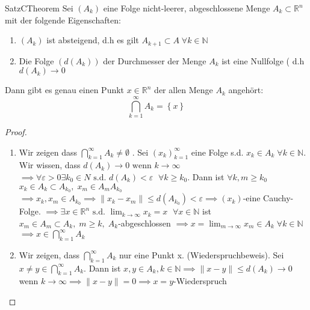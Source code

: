 \begin{ibox}[24]{Satz}{CTheorem}
    Sei $ \left( A_{k} \right) $ eine Folge nicht-leerer, abgeschlossene Menge $ A_{k} \subset
	\mathbb{R}^n  $ mit der folgende Eigenschaften:
	\begin{enumerate}[label=\alph*)]
		\item $ \left( A_{k} \right) $ ist absteigend, d.h es gilt $ A_{k+1} \subset A \; \forall 
			k \in  \mathbb{N} $ 
		\item Die Folge $ \left( d \left( A_{k} \right)  \right)  $ der Durchmesser der Menge $ A_k $ 
			ist eine Nullfolge ( d.h $ d \left( A_k \right) \to 0 $ 
	\end{enumerate}
	Dann gibt es genau einen Punkt $ x \in \mathbb{R}^n  $ der allen Menge $ A_{k} $ angehört:
	$$ \bigcap\limits_{k=1}^{\infty} A_k = \left\{ x \right\}   $$
\end{ibox}
\begin{proof}
	\begin{enumerate}[label=\alph*)]
		\item Wir zeigen dass $ \bigcap\limits_{k=1}^{\infty} A_k \neq \emptyset  $ . Sei 
			$ \left( x_{k} \right)_{k =1}^{\infty} $ eine Folge s.d. $ x_{k} \in A_k \; \forall 
			k \in  \mathbb{N} $. Wir wissen, dass $ d \left( A_k \right) \to 0 \text{ wenn } k \to
			\infty $ $ \implies \forall \varepsilon >0 \exists k_0 \in N \text{ s.d. } 
			d \left( A_k \right) < \varepsilon \; $ $ \forall k \geq k_0 $. Dann ist $ \forall 
			k,m \geq k_0 \; \; \; \;$  $  x_{k} \in A_k \subset A_{k_{0}}, \; x_{m} \in A_{m} A_{k_0}$
			$ \implies x_{k}, x_{m} \in A_{k_0} \implies  \|x_{k} - x_{m} \| \leq d 
			\left( A_{k_0} \right) < \varepsilon  \implies \left( x_{k} \right)  $-eine Cauchy-Folge.
			$ \implies \exists x \in \mathbb{R}^n  \text{ s.d. } \lim_{k \to \infty} x_{k} = x $ 
			$ \; \forall x \in \mathbb{N}  $ ist $ x_{m} \in A_{m} \subset A_{k}, \;  m \geq k,
			\; A_{k}$-abgeschlossen $ \implies x = \lim_{m \to \infty}x_{m} \in A_{k} \; \forall k
			\in \mathbb{N} $ $ \implies  x \in  \bigcap\limits_{k=1}^{\infty} A_{k}  $ 
		\item Wir zeigen, dass $ \bigcap\limits_{k=1}^{\infty} A_{k}  $ nur eine Punkt x. 
			(Wiederspruchbeweis). Sei $ x \neq y \in \bigcap\limits_{k=1}^{\infty} A_{k} $. Dann ist 
			$ x,y \in A_{k}, k \in \mathbb{N}  \implies \|x-y \| \leq d \left( A_k \right) \to 0  $ 
			wenn $ k \to \infty \implies  \|x-y \| = 0 \implies x = y  $-Wiederspruch
	\end{enumerate}
\end{proof}

